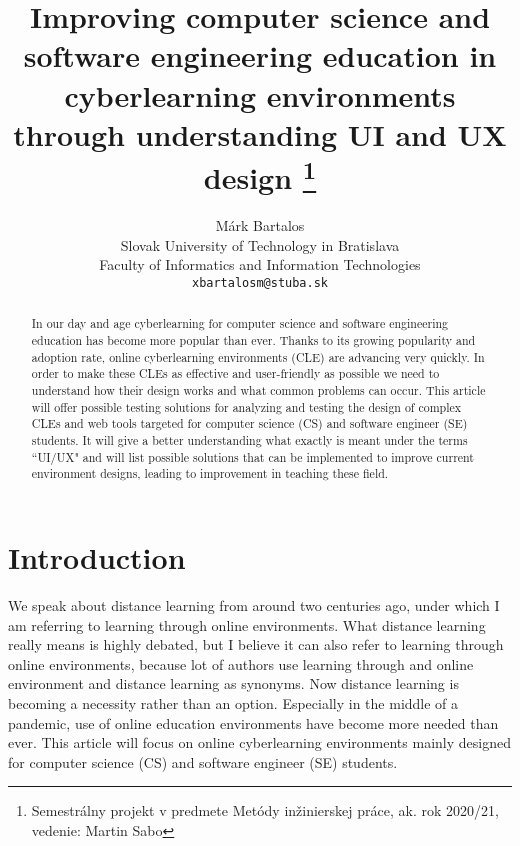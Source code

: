 \documentclass[10pt,english,a4paper]{article} %
\title{Improving computer science and software 
engineering education in cyberlearning 
environments through understanding UI and UX design
\thanks{Semestrálny projekt v predmete Metódy inžinierskej práce,
 ak. rok 2020/21, vedenie: Martin Sabo}}
\author{Márk Bartalos \\[2pt]
        \small{Slovak University of Technology in Bratislava}\\
        \small{Faculty of Informatics and Information Technologies}\\
        \small{\texttt{xbartalosm@stuba.sk}}
}
\begin{document}
\maketitle

\begin{abstract}
    In our day and age cyberlearning for computer science and software engineering education has become more popular than ever.
    Thanks to its growing popularity and adoption rate, online cyberlearning environments (CLE) are advancing very quickly.
    In order to make these CLEs as effective and user-friendly as possible we need to understand how their design
    works and what common problems can occur. This article will offer possible testing solutions for analyzing and testing
    the design of complex CLEs and web tools targeted for computer science (CS) and software engineer (SE) students. 
    It will give a better understanding what exactly is meant under the terms ``UI/UX" and will list possible solutions that
    can be implemented to improve current environment designs, leading to improvement in teaching these field.
\end{abstract}



\section{Introduction}
We speak about distance learning from around two centuries ago\cite{moore_2011_elearning}, under which
I am referring to learning through online environments. What distance learning really means is highly debated\cite{moore_2011_elearning},
but I believe it can also refer to learning through online environments, because lot of authors use learning through and online environment and distance learning as
synonyms\cite{distance_definition}\cite{moore_2011_elearning}. 
Now distance learning is becoming a necessity rather than an option. Especially in the middle of a pandemic, use of online 
education environments have become more needed than ever. This article will focus on online cyberlearning environments 
mainly designed for computer science (CS) and software engineer (SE) students.
\end{document}
